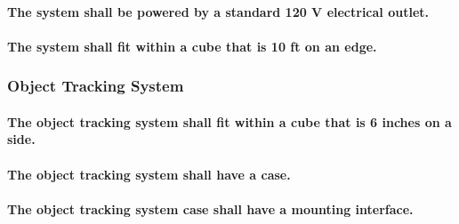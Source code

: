 \paragraph{The system shall be powered by a standard 120 V electrical outlet. }
\paragraph{The system shall fit within a cube that is 10 ft on an edge.}

\subsubsection{Object Tracking System}
\paragraph{The object tracking system shall fit within a cube that is 6 inches on a side.}
\paragraph{The object tracking system shall have a case. }
\paragraph{The object tracking system case shall have a mounting interface. }



